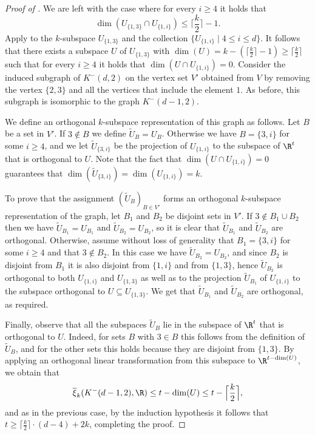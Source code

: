 \documentclass{toc}
\newcommand{\od}{\overline{\xi}}
\begin{document}
\begin{proof}[Proof of ]
We are left with the case where for every $i \geq 4$ it holds that
\[\dim(U_{\{1,3\}} \cap U_{\{1,i\}}) \leq \Big\lceil \frac{k}{2} \Big\rceil -1.\]
Apply  to the $k$-subspace $U_{\{1,3\}}$ and the collection $\{ U_{\{1,i\}} \mid 4 \leq i \leq d \}$.
It follows that there exists a subspace $U$ of $U_{\{1,3\}}$ with $\dim(U) = k- (\lceil \frac{k}{2} \rceil -1) \geq \lceil \frac{k}{2} \rceil$ such that for every $i \geq 4$ it holds that $\dim(U \cap U_{\{1,i\}}) = 0$.
Consider the induced subgraph of $K^{-}(d,2)$ on the vertex set $V'$ obtained from $V$ by removing the vertex $\{2,3\}$ and all the vertices that include the element $1$. As before, this subgraph is isomorphic to the graph $K^{-}(d-1,2)$.

We define an orthogonal $k$-subspace representation of this graph as follows.
Let $B$ be a set in $V'$.
If $3 \notin B$ we define $\widetilde{U}_B = U_B$.
Otherwise we have $B = \{3,i\}$ for some $i \geq 4$, and we let $\widetilde{U}_{\{3,i\}}$ be the projection of $U_{\{1,i\}}$ to the subspace of $\R^t$ that is orthogonal to $U$.
Note that the fact that $\dim(U \cap U_{\{1,i\}}) = 0$ guarantees that $\dim(\widetilde{U}_{\{3,i\}}) = \dim(U_{\{1,i\}}) = k$.

To prove that the assignment $(\widetilde{U}_B)_{B \in V'}$ forms an orthogonal $k$-subspace representation of the graph, let $B_1$ and $B_2$ be disjoint sets in $V'$.
If $3 \notin B_1 \cup B_2$ then we have $\widetilde{U}_{B_1} = U_{B_1}$ and $\widetilde{U}_{B_2} = U_{B_2}$, so it is clear that $\widetilde{U}_{B_1}$ and $\widetilde{U}_{B_2}$ are orthogonal.
Otherwise, assume without loss of generality that $B_1 = \{3,i\}$ for some $i \geq 4$ and that $3 \notin B_2$.
In this case we have $\widetilde{U}_{B_2} = U_{B_2}$, and since $B_2$ is disjoint from $B_1$ it is also disjoint from $\{1,i\}$ and from $\{1,3\}$, hence $\widetilde{U}_{B_2}$ is orthogonal to both $U_{\{1,i\}}$ and $U_{\{1,3\}}$ as well as to the projection $\widetilde{U}_{B_1}$ of $U_{\{1,i\}}$ to the subspace orthogonal to $U \subseteq U_{\{1,3\}}$.
We get that $\widetilde{U}_{B_1}$ and $\widetilde{U}_{B_2}$ are orthogonal, as required.

Finally, observe that all the subspaces $\widetilde{U}_{B}$ lie in the subspace of $\R^t$ that is orthogonal to $U$.
Indeed, for sets $B$ with $3 \in B$ this follows from the definition of $\widetilde{U}_{B}$, and for the other sets this holds because they are disjoint from $\{1,3\}$.
By applying an orthogonal linear transformation from this subspace to $\R^{t-\dim(U)}$, we obtain that
\[ \od_k(K^{-}(d-1,2),\R) \leq t- \dim(U) \leq t- \Big\lceil \frac{k}{2} \Big\rceil,\]
and as in the previous case, by the induction hypothesis it follows that
$t \geq \lceil \frac{k}{2} \rceil \cdot (d-4)+2k$, completing the proof.
\end{proof}
\end{document}
